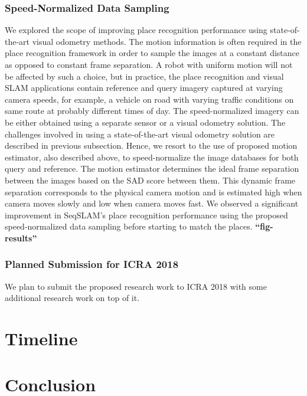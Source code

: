 \documentclass{article}
\begin{document}
\subsubsection{Speed-Normalized Data Sampling}
We explored the scope of improving place recognition performance using state-of-the-art visual odometry methods. The motion information is often required in the place recognition framework in order to sample the images at a constant distance as opposed to constant frame separation. A robot with uniform motion will not be affected by such a choice, but in practice, the place recognition and visual SLAM applications contain reference and query imagery captured at varying camera speeds, for example, a vehicle on road with varying traffic conditions on same route at probably different times of day. The speed-normalized imagery can be either obtained using a separate sensor or a visual odometry solution. The challenges involved in using a state-of-the-art visual odometry solution are described in previous subsection. Hence, we resort to the use of proposed motion estimator, also described above, to speed-normalize the image databases for both query and reference. The motion estimator determines the ideal frame separation between the images based on the SAD score between them. This dynamic frame separation corresponds to the physical camera motion and is estimated high when camera moves slowly and low when camera moves fast. We observed a significant improvement in SeqSLAM's place recognition performance using the proposed speed-normalized data sampling before starting to match the places. \textbf{``fig-results''}

\subsubsection{Planned Submission for ICRA 2018}
We plan to submit the proposed research work to ICRA 2018 with some additional research work on top of it.

\section{Timeline}


\section{Conclusion}



\end{document}
